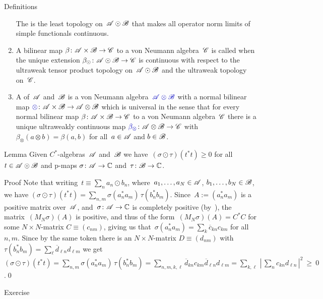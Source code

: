 \documentclass[a]{subfiles}
\begin{document}
\begin{parsec}
\begin{point}{Definitions}
\begin{enumerate}
The 
is the least topology on~$\mathscr{A}\odot\mathscr{B}$
that makes all operator norm limits
of simple functionals continuous.
\item
A bilinear map $\beta\colon \mathscr{A}\times \mathscr{B}\to\mathscr{C}$
to a von Neumann algebra~$\mathscr{C}$
is called 
when the unique extension $\beta_\odot \colon \mathscr{A}\odot \mathscr{B}\to \mathscr{C}$
is continuous with respect to the ultraweak tensor product topology 
on~$\mathscr{A}\odot\mathscr{B}$
and the ultraweak topology on~$\mathscr{C}$.
\item
A  of~$\mathscr{A}$ and~$\mathscr{B}$
is a von Neumann algebra~$\Define{\scrA\otimes \scrB}$
with a normal
bilinear map $\Define{\otimes} \colon \scrA\times \scrB\to
\scrA\otimes \scrB$
which is universal
in the sense
that for every
normal bilinear map $\beta\colon \mathscr{A}\times \mathscr{B}\to\mathscr{C}$
to a von Neumann algebra~$\mathscr{C}$
there is a unique ultraweakly continuous
map $\Define{\beta_\otimes}\colon \scrA\otimes \scrB
\to \scrC$ with $\beta_\otimes(a\otimes b) = \beta(a,b)$
for all~$a\in \mathscr{A}$ and $b\in\mathscr{B}$.
\end{enumerate}
\end{point}
\begin{point}{Lemma}%
Given $C^*$-algebras~$\mathscr{A}$ and~$\mathscr{B}$
we have~$(\sigma\odot \tau) (t^*t)\geq 0$
for all  $t\in\mathscr{A}\odot\mathscr{B}$
and p-maps  $\sigma\colon \mathscr{A}\to\mathbb{C}$
and~$\tau\colon \mathscr{B}\to\mathbb{C}$.
\begin{point}{Proof}%
Note that writing~$t\equiv \sum_n a_n \odot b_n$,
where~$a_1,\dotsc,a_N\in \mathscr{A}$, $b_1,\dotsc,b_N\in \mathscr{B}$,
we have
$(\sigma\odot\tau)(t^*t)
= \sum_{n,m} \sigma(a_n^*a_m)\,\tau(b_n^*b_m)$.
Since~$A:=(a_n^*a_m)$
is a positive matrix over~$\mathscr{A}$,
and~$\sigma\colon \mathscr{A}\to\mathbb{C}$
is completely positive (by~),
the matrix~$(M_N\sigma)(A)$ is positive,
and thus of the form~$(M_N\sigma)(A) = C^*C$
for some $N\times N$-matrix  $C\equiv(c_{nm})$,
giving us that~$\sigma(a_n^*a_m)=\sum_k \overline{c}_{kn} c_{km}$
for all~$n,m$.
Since by the same token there is an $N\times N$-matrix
$D\equiv(d_{nm})$
with
$\tau(b_n^* b_m ) = \sum_\ell \overline{d}_{\ell n} d_{\ell m}$
we get
$(\sigma\odot\tau)(t^*t)
= \sum_{n,m} \sigma(a_n^*a_m)\,\tau(b_n^*b_m)
= \sum_{n,m,k,\ell } \overline{d}_{k n}
c_{k m} \overline{d}_{\ell n} d_{\ell m}
= \sum_{k,\ell}\,\left|\,\sum_{n} c_{k n} d_{\ell n}\,\right|^2
\ \geq\  0$.\qed
\end{point}
\end{point}
\begin{point}{Exercise}%

\end{point}
\end{parsec}
\end{document}
